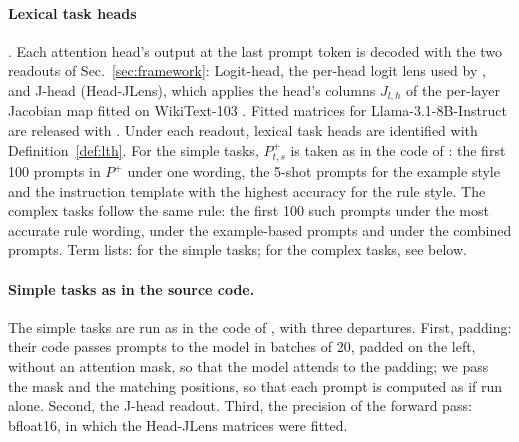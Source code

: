 \documentclass[11pt,a4paper]{article}
\begin{document}
\paragraph{Lexical task heads} \citep[Sec.~2.2.2]{yang2026shared}.
Each attention head's output at the last prompt token is decoded with the two readouts of Sec.~\ref{sec:framework}: Logit-head, the per-head logit lens used by \citet{yang2026shared} \citep{nostalgebraist2020logitlens}, and J-head (Head-JLens), which applies the head's columns $J_{l,h}$ of the per-layer Jacobian map fitted on WikiText-103 \citep[Sec.~2]{merlo2026headjlens}. Fitted matrices for Llama-3.1-8B-Instruct are released with \citet[Sec.~S4]{merlo2026headjlens}.
Under each readout, lexical task heads are identified with Definition~\ref{def:lth}.
For the simple tasks, $P^{+}_{t,s}$ is taken as in the code of \citet{yang2026shared}: the first 100 prompts in $P^{+}$ under one wording, the 5-shot prompts for the example style and the instruction template with the highest accuracy for the rule style. The complex tasks follow the same rule: the first 100 such prompts under the most accurate rule wording, under the example-based prompts and under the combined prompts.
Term lists: \citet[App.~A.2.1]{yang2026shared} for the simple tasks; for the complex tasks, see below.

\paragraph{Simple tasks as in the source code.} The simple tasks are run as in the code of \citet{yang2026shared}, with three departures. First, padding: their code passes prompts to the model in batches of 20, padded on the left, without an attention mask, so that the model attends to the padding; we pass the mask and the matching positions, so that each prompt is computed as if run alone. Second, the J-head readout. Third, the precision of the forward pass: bfloat16, in which the Head-JLens matrices were fitted.
\end{document}
